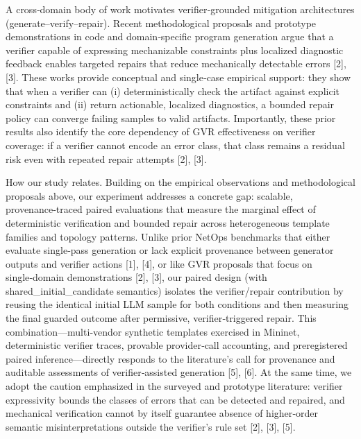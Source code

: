 \documentclass[conference]{IEEEtran}
\begin{document}
A cross‑domain body of work motivates verifier‑grounded mitigation architectures (generate--verify--repair). Recent methodological proposals and prototype demonstrations in code and domain‑specific program generation argue that a verifier capable of expressing mechanizable constraints plus localized diagnostic feedback enables targeted repairs that reduce mechanically detectable errors [2], [3]. These works provide conceptual and single‑case empirical support: they show that when a verifier can (i) deterministically check the artifact against explicit constraints and (ii) return actionable, localized diagnostics, a bounded repair policy can converge failing samples to valid artifacts. Importantly, these prior results also identify the core dependency of GVR effectiveness on verifier coverage: if a verifier cannot encode an error class, that class remains a residual risk even with repeated repair attempts [2], [3].

How our study relates. Building on the empirical observations and methodological proposals above, our experiment addresses a concrete gap: scalable, provenance‑traced paired evaluations that measure the marginal effect of deterministic verification and bounded repair across heterogeneous template families and topology patterns. Unlike prior NetOps benchmarks that either evaluate single‑pass generation or lack explicit provenance between generator outputs and verifier actions [1], [4], or like GVR proposals that focus on single‑domain demonstrations [2], [3], our paired design (with shared\_initial\_candidate semantics) isolates the verifier/repair contribution by reusing the identical initial LLM sample for both conditions and then measuring the final guarded outcome after permissive, verifier‑triggered repair. This combination---multi‑vendor synthetic templates exercised in Mininet, deterministic verifier traces, provable provider‑call accounting, and preregistered paired inference---directly responds to the literature's call for provenance and auditable assessments of verifier‑assisted generation [5], [6]. At the same time, we adopt the caution emphasized in the surveyed and prototype literature: verifier expressivity bounds the classes of errors that can be detected and repaired, and mechanical verification cannot by itself guarantee absence of higher‑order semantic misinterpretations outside the verifier's rule set [2], [3], [5].
\end{document}
